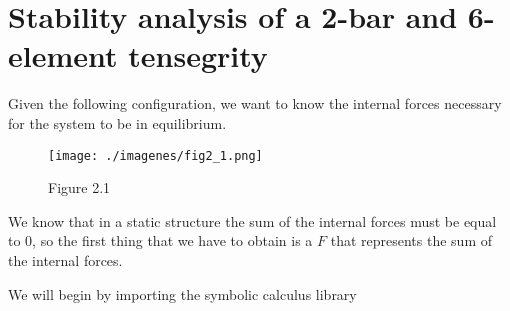 %
%
%
%
%
%
%
%
%
%
%
%     
%

    \maketitle





    \section{Stability analysis of a 2-bar and 6-element tensegrity}


    Given the following configuration, we want to know the internal forces
necessary for the system to be in equilibrium.

\begin{figure}[htbp]
\centering
\texttt{[image: ./imagenes/fig2\_1.png]}
\caption{Figure 2.1}
\end{figure}

We know that in a static structure the sum of the internal forces must
be equal to \(0\), so the first thing that we have to obtain is a \(F\)
that represents the sum of the internal forces.

    We will begin by importing the symbolic calculus library

